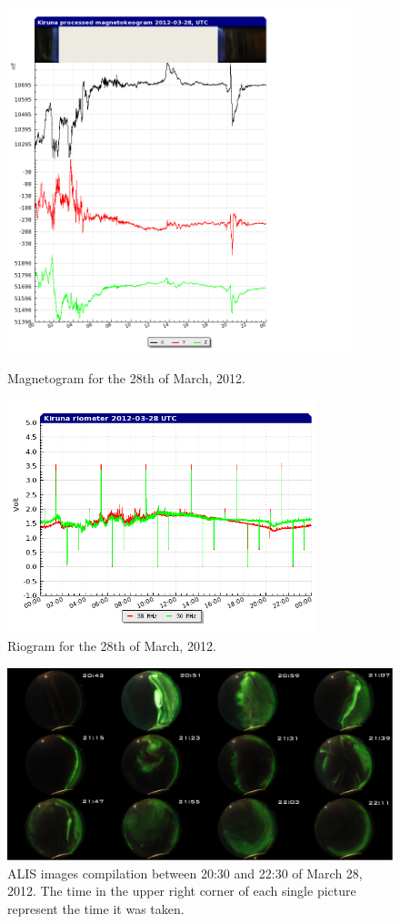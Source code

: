 \documentclass{article}
\begin{document}
\begin{figure}[ht]
\begin{minipage}[b]{0.5\linewidth}
\centering
\includegraphics[width=10cm]{Figures/magnetometer.png}
\caption{Magnetogram for the 28th of March, 2012.}
\label{fig:magnetometer}
\end{minipage}
\hspace{0.2cm}
\begin{minipage}[b]{0.5\linewidth}
\centering
\includegraphics[width=9cm]{Figures/riometer.png}
\caption{Riogram for the 28th of March, 2012.}
\label{fig:riometer}
\end{minipage}
\end{figure}

\begin{figure}[htbp!]
\centering
\centerline{\includegraphics[width=\textwidth]{Figures/awowa.png}}
\caption{ALIS images compilation between 20:30 and 22:30 of March 28, 2012. The time in the upper right corner of each single picture represent the time it was taken.}
\label{fig:ALIS}
\end{figure}
\end{document}
